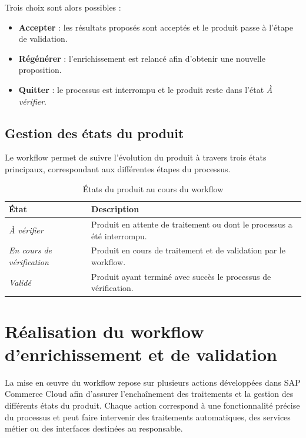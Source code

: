 Trois choix sont alors possibles :

\begin{itemize}
\item \textbf{Accepter} : les résultats proposés sont acceptés et le produit passe à l'étape de validation.
\item \textbf{Régénérer} : l'enrichissement est relancé afin d'obtenir une nouvelle proposition.
\item \textbf{Quitter} : le processus est interrompu et le produit reste dans l'état \textit{À vérifier}.
\end{itemize}

\subsection{Gestion des états du produit}

Le workflow permet de suivre l'évolution du produit à travers trois états principaux, correspondant aux différentes étapes du processus.

\begin{table}[H]
\centering
\caption{États du produit au cours du workflow}
\label{tab:etats_produit}
\renewcommand{\arraystretch}{1.4}
\begin{tabular}{|p{5cm}|p{9.5cm}|}
\hline
\textbf{État} & \textbf{Description} \\
\hline
\textit{À vérifier} & Produit en attente de traitement ou dont le processus a été interrompu. \\
\hline
\textit{En cours de vérification} & Produit en cours de traitement et de validation par le workflow. \\
\hline
\textit{Validé} & Produit ayant terminé avec succès le processus de vérification. \\
\hline
\end{tabular}
\end{table}

\section{Réalisation du workflow d'enrichissement et de validation}

La mise en œuvre du workflow repose sur plusieurs actions développées dans SAP Commerce Cloud afin d'assurer l'enchaînement des traitements et la gestion des différents états du produit. Chaque action correspond à une fonctionnalité précise du processus et peut faire intervenir des traitements automatiques, des services métier ou des interfaces destinées au responsable.

